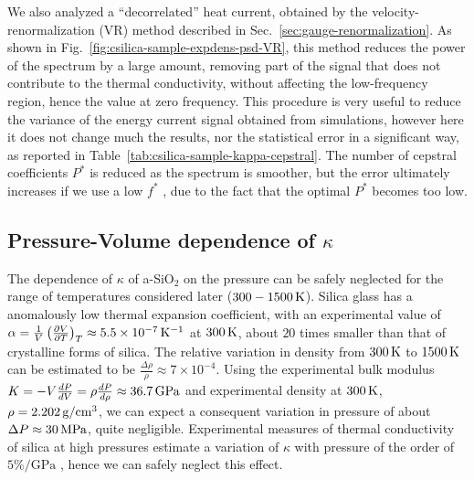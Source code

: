 We also analyzed a ``decorrelated'' heat current, obtained by the velocity-renormalization (VR) method described in Sec.~\ref{sec:gauge-renormalization}. As shown in Fig.~\ref{fig:csilica-sample-expdens-psd-VR}, this method reduces the power of the spectrum by a large amount, removing part of the signal that does not contribute to the thermal conductivity, without affecting the low-frequency region, hence the value at zero frequency. 
This procedure is very useful to reduce the variance of the energy current signal obtained from \abinitio simulations, however here it does not change much the results, nor the statistical error in a significant way, as reported in Table~\ref{tab:csilica-sample-kappa-cepstral}. 
The number of cepstral coefficients $P^*$ is reduced as the spectrum is smoother, but the error ultimately increases if we use a low $f^*$ , due to the fact that the optimal $P^*$ becomes too low. 



\subsection{Pressure-Volume dependence of $\kappa$}
The dependence of $\kappa$ of a-SiO$_2$ on the pressure can be safely neglected for the range of temperatures considered later ($300-1500\,\mathrm{K}$). 
Silica glass has a anomalously low thermal expansion coefficient, with an experimental value of $\alpha = \frac{1}{V}\left(\frac{\partial V}{\partial T}\right)_T \approx 5.5\times 10^{-7} \,\mathrm{K^{-1}}$ at $300\,\mathrm{K}$, about $20$ times smaller than that of crystalline forms of silica. 
The relative variation in density from $300\,\mathrm{K}$ to $1500\,\mathrm{K}$ can be estimated to be $\frac{\Delta\rho}{\rho} \approx 7\times 10^{-4}$.
Using the experimental bulk modulus $K=-V\frac{dP}{dV}=\rho\frac{dP}{d\rho}\approx 36.7\,\mathrm{GPa}$ and experimental density at $300\,\mathrm{K}$, $\rho=2.202\,\mathrm{g/cm^3}$, we can expect a consequent variation in pressure of about $\Delta P \approx 30\,\mathrm{MPa}$, quite negligible. 
Experimental measures of thermal conductivity of silica at high pressures estimate a variation of $\kappa$ with pressure of the order of $5\%/\mathrm{GPa}$ \cite{Andersson1992}, hence we can safely neglect this effect. 

